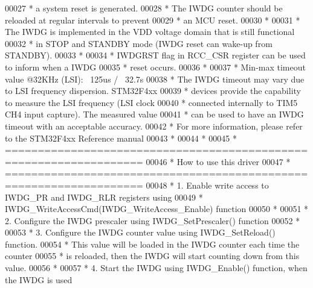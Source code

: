 \begin{DoxyCode}
00027 \textcolor{comment}{  *          a system reset is generated.}
00028 \textcolor{comment}{  *          The IWDG counter should be reloaded at regular intervals to prevent}
00029 \textcolor{comment}{  *          an MCU reset.}
00030 \textcolor{comment}{  *                           }
00031 \textcolor{comment}{  *          The IWDG is implemented in the VDD voltage domain that is still functional}
00032 \textcolor{comment}{  *          in STOP and STANDBY mode (IWDG reset can wake-up from STANDBY).          }
00033 \textcolor{comment}{  *            }
00034 \textcolor{comment}{  *          IWDGRST flag in RCC\_CSR register can be used to inform when a IWDG}
00035 \textcolor{comment}{  *          reset occurs.}
00036 \textcolor{comment}{  *            }
00037 \textcolor{comment}{  *          Min-max timeout value @32KHz (LSI): ~125us / ~32.7s}
00038 \textcolor{comment}{  *          The IWDG timeout may vary due to LSI frequency dispersion. STM32F4xx}
00039 \textcolor{comment}{  *          devices provide the capability to measure the LSI frequency (LSI clock}
00040 \textcolor{comment}{  *          connected internally to TIM5 CH4 input capture). The measured value}
00041 \textcolor{comment}{  *          can be used to have an IWDG timeout with an acceptable accuracy. }
00042 \textcolor{comment}{  *          For more information, please refer to the STM32F4xx Reference manual}
00043 \textcolor{comment}{  *          }
00044 \textcolor{comment}{  *                            }
00045 \textcolor{comment}{  *          ===================================================================}
00046 \textcolor{comment}{  *                                 How to use this driver}
00047 \textcolor{comment}{  *          ===================================================================}
00048 \textcolor{comment}{  *          1. Enable write access to IWDG\_PR and IWDG\_RLR registers using}
00049 \textcolor{comment}{  *             IWDG\_WriteAccessCmd(IWDG\_WriteAccess\_Enable) function}
00050 \textcolor{comment}{  *               }
00051 \textcolor{comment}{  *          2. Configure the IWDG prescaler using IWDG\_SetPrescaler() function}
00052 \textcolor{comment}{  *            }
00053 \textcolor{comment}{  *          3. Configure the IWDG counter value using IWDG\_SetReload() function.}
00054 \textcolor{comment}{  *             This value will be loaded in the IWDG counter each time the counter}
00055 \textcolor{comment}{  *             is reloaded, then the IWDG will start counting down from this value.}
00056 \textcolor{comment}{  *            }
00057 \textcolor{comment}{  *          4. Start the IWDG using IWDG\_Enable() function, when the IWDG is used}

\end{DoxyCode}
